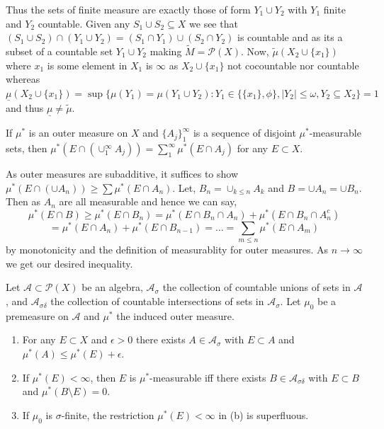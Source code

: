 \documentclass[12pt,a4paper]{article}
\begin{document}
\begin{solution}
\begin{enumerate}[label=\alph*.]
        Thus the sets of finite measure are exactly those of form $Y_1\cup Y_2$ with $Y_1$ finite and $Y_2$ countable. 
        Given any $S_1\cup S_2\subseteq X$ we see that $(S_1\cup S_2)\cap(Y_1\cup Y_2)=(S_1\cap Y_1)\cup(S_2\cap Y_2)$ is countable and as its a subset of a countable set $Y_1\cup Y_2$ making $\tilde{M}=\mathcal P(X)$. 
        Now, $\tilde{\mu}(X_2\cup\{x_1\})$ where $x_1$ is some element in $X_1$ is $\infty$ as $X_2\cup\{x_1\}$ not cocountable nor countable whereas $\underline{\mu}(X_2\cup\{x_1\})=\sup\{\mu(Y_1)=\mu(Y_1\cup Y_2):Y_1\in\{\{x_1\},\phi\},|Y_2|\leq\omega,Y_2\subseteq X_2\}=1$ and thus $\underline{\mu}\neq\tilde{\mu}.$
    \end{enumerate} 
\end{solution}
\begin{problem}\label{prob:1-17}
If $\mu^*$ is an outer measure on $X$ and $\{A_j\}_1^\infty$ is a sequence of disjoint $\mu^*$-measurable sets, then $\mu^*(E \cap (\cup_1^\infty A_j)) = \sum_1^\infty \mu^*(E \cap A_j)$ for any $E \subset X$.
\end{problem}
\begin{solution}
    As outer measures are subadditive, it suffices to show $\mu^*(E\cap(\cup A_n))\geq\sum\mu^*(E\cap A_n).$ 
    Let, $B_n=\cup_{k\leq n}A_k$ and $B=\cup A_n=\cup B_n.$ 
    Then as $A_n$ are all measurable and hence we can say,
    $$\mu^*(E\cap B)\geq\mu^*(E\cap B_n)=\mu^*(E\cap B_n\cap A_n)+\mu^*(E\cap B_n\cap A_n^c)$$
    $$=\mu^*(E\cap A_n)+\mu^*(E\cap B_{n-1})=\ldots=\sum_{m\leq n}\mu^*(E\cap A_m)$$
    by monotonicity and the definition of measurablity for outer measures. 
    As $n\to\infty$ we get our desired inequality. 
\end{solution}
\begin{problem}\label{prob:1-18}
Let $\mathcal{A} \subset \mathcal{P}(X)$ be an algebra, $\mathcal{A}_\sigma$ the collection of countable unions of sets in $\mathcal{A}$, and $\mathcal{A}_{\sigma\delta}$ the collection of countable intersections of sets in $\mathcal{A}_\sigma$. Let $\mu_0$ be a premeasure on $\mathcal{A}$ and $\mu^*$ the induced outer measure.
\begin{enumerate}[label=\alph*.]
    \item For any $E \subset X$ and $\epsilon > 0$ there exists $A \in \mathcal{A}_\sigma$ with $E \subset A$ and $\mu^*(A) \le \mu^*(E) + \epsilon$.
    \item If $\mu^*(E) < \infty$, then $E$ is $\mu^*$-measurable iff there exists $B \in \mathcal{A}_{\sigma\delta}$ with $E \subset B$ and $\mu^*(B \setminus E) = 0$.
    \item If $\mu_0$ is $\sigma$-finite, the restriction $\mu^*(E) < \infty$ in (b) is superfluous.
\end{enumerate}
\end{problem}
\end{document}
